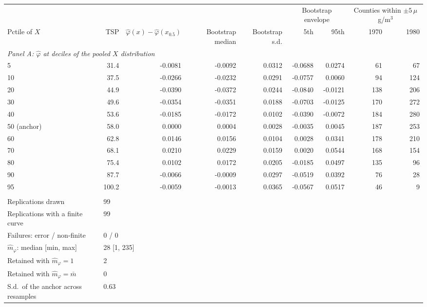 \begin{tabular}{lrrrrrrrr}
\toprule
& & & & & \multicolumn{2}{c}{Bootstrap envelope} & \multicolumn{2}{c}{Counties within $\pm5\,\mu$g/m$^3$} \\
\cmidrule(lr){6-7} \cmidrule(lr){8-9}
Pctile of $X$ & TSP & $\hat\varphi(x)-\hat\varphi(x_{0.5})$ & Bootstrap median & Bootstrap s.d. & 5th & 95th & 1970 & 1980 \\
\midrule
\multicolumn{9}{l}{\textit{Panel A: $\hat\varphi$ at deciles of the pooled $X$ distribution}} \\
\midrule
5 & 31.4 & -0.0081 & -0.0092 & 0.0312 & -0.0688 & 0.0274 & 61 & 67 \\
10 & 37.5 & -0.0266 & -0.0232 & 0.0291 & -0.0757 & 0.0060 & 94 & 124 \\
20 & 44.9 & -0.0390 & -0.0372 & 0.0244 & -0.0840 & -0.0121 & 138 & 206 \\
30 & 49.6 & -0.0354 & -0.0351 & 0.0188 & -0.0703 & -0.0125 & 170 & 272 \\
40 & 53.6 & -0.0185 & -0.0172 & 0.0102 & -0.0390 & -0.0072 & 184 & 280 \\
50 (anchor) & 58.0 & 0.0000 & 0.0004 & 0.0028 & -0.0035 & 0.0045 & 187 & 253 \\
60 & 62.8 & 0.0146 & 0.0156 & 0.0104 & 0.0028 & 0.0341 & 178 & 210 \\
70 & 68.1 & 0.0210 & 0.0229 & 0.0159 & 0.0020 & 0.0544 & 168 & 154 \\
80 & 75.4 & 0.0102 & 0.0172 & 0.0205 & -0.0185 & 0.0497 & 135 & 96 \\
90 & 87.7 & -0.0066 & -0.0009 & 0.0297 & -0.0519 & 0.0392 & 76 & 28 \\
95 & 100.2 & -0.0059 & -0.0013 & 0.0365 & -0.0567 & 0.0517 & 46 & 9 \\
\addlinespace
\multicolumn{9}{l}{\textit{Panel B: bootstrap design and convergence}} \\
\midrule
Replications drawn & \multicolumn{8}{l}{99} \\
Replications with a finite curve & \multicolumn{8}{l}{99} \\
Failures: error / non-finite & \multicolumn{8}{l}{0 / 0} \\
$\hat m_\varphi$: median [min, max] & \multicolumn{8}{l}{28 [1, 235]} \\
Retained with $\hat m_\varphi = 1$ & \multicolumn{8}{l}{2} \\
Retained with $\hat m_\varphi = \bar m$ & \multicolumn{8}{l}{0} \\
S.d.\ of the anchor across resamples & \multicolumn{8}{l}{0.63} \\

\end{tabular}
